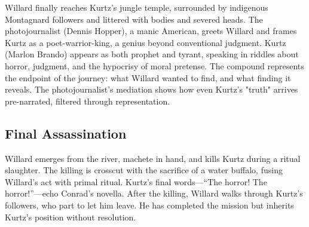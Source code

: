 Willard finally reaches Kurtz's jungle temple, surrounded by indigenous Montagnard followers
and littered with bodies and severed heads. The photojournalist (Dennis Hopper), a manic
American, greets Willard and frames Kurtz as a poet-warrior-king, a genius beyond conventional
judgment. Kurtz (Marlon Brando) appears as both prophet and tyrant, speaking in riddles about
horror, judgment, and the hypocrisy of moral pretense. The compound represents the endpoint of
the journey: what Willard wanted to find, and what finding it reveals. The photojournalist's
mediation shows how even Kurtz's "truth" arrives pre-narrated, filtered through representation.

\pagebreak[0]
\subsection*{Final Assassination}
\label{scene:assassination}

Willard emerges from the river, machete in hand, and kills Kurtz during a ritual slaughter.
The killing is crosscut with the sacrifice of a water buffalo, fusing Willard's act with
primal ritual. Kurtz's final words---``The horror! The horror!''---echo Conrad's novella.
After the killing, Willard walks through Kurtz's followers, who part to let him leave. He has
completed the mission but inherits Kurtz's position without resolution.
